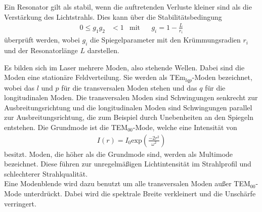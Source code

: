 Ein Resonator gilt als stabil, wenn die auftretenden Verluste kleiner sind als die Verstärkung des Lichtstrahls.
Dies kann über die Stabilitätsbedingung
\begin{align}
    0 \leq g_1 g_2 &< 1 & \text{mit}& & g_i = 1 - \frac{L}{r_i} \label{eqn:Stabilitätsbedingung}
\end{align}
überprüft werden, wobei $g_i$ die Spiegelparameter mit den Krümmungsradien $r_i$ und der Resonatorlänge $L$ darstellen.

Es bilden sich im Laser mehrere Moden, also stehende Wellen. Dabei sind die Moden eine stationäre Feldverteilung. Sie werden als TEm$_{lqp}$-Moden bezeichnet, wobei das $l$ und $p$ für die 
transversalen Moden stehen und das $q$ für die longitudinalen Moden. Die transversalen Moden sind Schwingungen senkrecht zur Ausbreitungsrichtung und die longitudinalen Moden sind
Schwingungen parallel zur Ausbreitungsrichtung, die zum Beispiel durch Unebenheiten an den Spiegeln entstehen. Die Grundmode ist die TEM$_{00}$-Mode, welche eine Intensität von 
\begin{align*}
    I(r) = I_0 \text{exp}(\frac{-2r^2}{\omega^2})
\end{align*}
besitzt. Moden, die höher als die Grundmode sind, werden als Multimode bezeichnet. Diese führen zur unregelmäßigen Lichtintensität im Strahlprofil und schlechterer Strahlqualität.\\
Eine Modenblende wird dazu benutzt um alle transversalen Moden außer TEM$_{00}$-Mode unterdrückt. Dabei wird die spektrale Breite verkleinert und die Unschärfe verringert.




